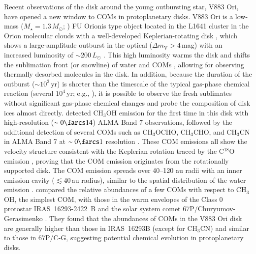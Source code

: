 \documentclass[linenumbers, twocolumn, twocolappendix, astrosymb, times]{aastex631}
\newcommand{\methanol}{CH$_3$OH\xspace}
\newcommand{\acetaldehyde}{CH$_3$CHO\xspace}
\newcommand{\methylformate}{CH$_3$OCHO\xspace}
\begin{document}
Recent observations of the disk around the young outbursting star, V883 Ori, have opened a new window to COMs in protoplanetary disks. V883 Ori is a low-mass ($M_\star = 1.3\,M_\odot$; \citealt{Cieza2016}) FU Orionis type object located in the L1641 cluster in the Orion molecular clouds \citep[$d\approx400$\,pc;][]{Strom1993} with a well-developed Keplerian-rotating disk \citep{Cieza2016}, which shows a large-amplitude outburst in the optical ($\Delta m_\mathrm{V} > 4$\,mag) with an increased luminosity of $\sim200\,L_\odot$ \citep{Furlan2016}. This high luminosity warms the disk and shifts the sublimation front (or snowline) of water and COMs \citep{Tobin2023}, allowing for observing thermally desorbed molecules in the disk. In addition, because the duration of the outburst ($\sim10^2$\,yr) is shorter than the timescale of the typical gas-phase chemical reaction (several $10^4$\,yr; e.g., \citealt{Nomura2009}), it is possible to observe the fresh sublimates without significant gas-phase chemical changes and probe the composition of disk ices almost directly. 
\citet{vantHoff2018} detected \methanol emission for the first time in this disk with high-resolution ($\sim0\farcs14$) ALMA Band 7 observations, followed by the additional detection of several COMs such as \methylformate, \acetaldehyde, and CH$_3$CN in ALMA Band 7 at $\sim0\farcs1$ resolution \citep{Lee2019}. These COM emissions all show the velocity structure consistent with the Keplerian rotation traced by the C$^{18}$O emission \citep{Cieza2016, vantHoff2018}, proving that the COM emission originates from the rotationally supported disk. The COM emission spreads over 40--120 au radii with an inner emission cavity ($\lesssim40$\,au radius), similar to the spatial distribution of the water emission \citep{Tobin2023}. \citet{Lee2019} compared the relative abundances of a few COMs with respect to \methanol, the simplest COM, with those in the warm envelopes of the Class 0 protostar IRAS~16293-2422~B \citep[hereafter IRAS~16293B; e.g.,][]{Jorgensen2016} and the solar system comet 67P/Churyumov-Gerasimenko \citep[hereafter 67P/C-G; e.g.,][]{Altwegg2019}. They found that the abundances of COMs in the V883 Ori disk are generally higher than those in IRAS~16293B (except for CH$_3$CN) and similar to those in 67P/C-G, suggesting potential chemical evolution in protoplanetary disks.
\end{document}
